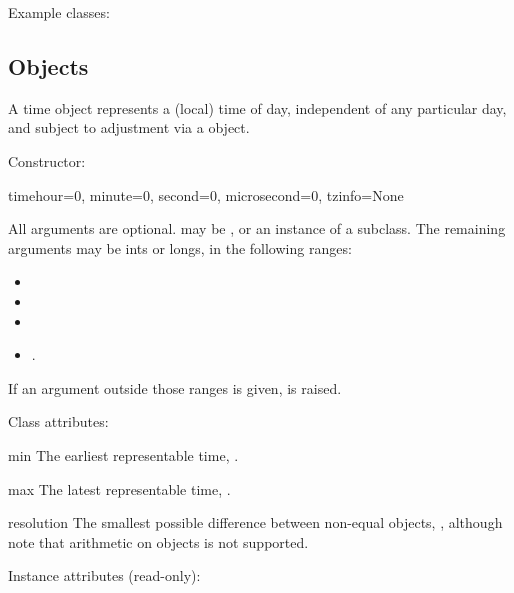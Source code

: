 Example  classes:




\subsection{ Objects \label{datetime-timetz}}

A time object represents a (local) time of day, independent of any
particular day, and subject to adjustment via a  object.

Constructor:

\begin{funcdesc}{time}{hour=0, minute=0, second=0, microsecond=0, tzinfo=None}

    All arguments are optional.   may be , or
    an instance of a  subclass.  The remaining arguments
    may be ints or longs, in the following ranges:

\begin{itemize}
  \item {}
  \item {}
  \item {}
  \item {}.
\end{itemize}

    If an argument outside those ranges is given,
     is raised.
\end{funcdesc}

Class attributes:

\begin{memberdesc}{min}
        The earliest representable time, .
\end{memberdesc}

\begin{memberdesc}{max}
        The latest representable time, .
\end{memberdesc}

\begin{memberdesc}{resolution}
        The smallest possible difference between non-equal 
        objects, , although note that
        arithmetic on  objects is not supported.
\end{memberdesc}

Instance attributes (read-only):

